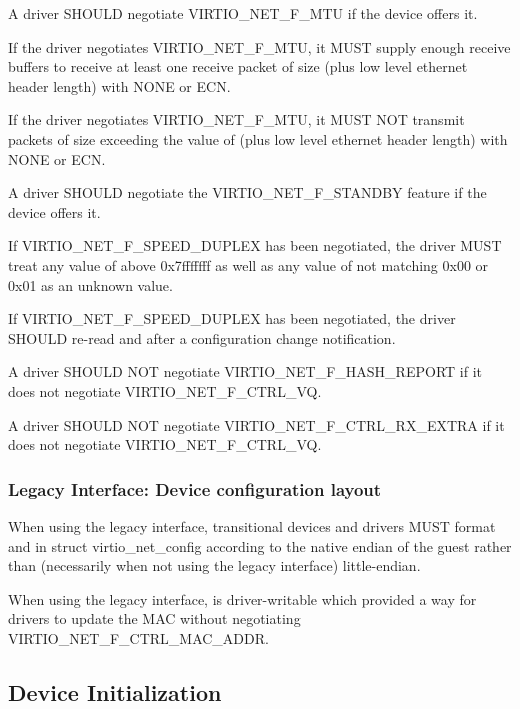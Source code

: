 A driver SHOULD negotiate VIRTIO_NET_F_MTU if the device offers it.

If the driver negotiates VIRTIO_NET_F_MTU, it MUST supply enough receive
buffers to receive at least one receive packet of size  (plus low
level ethernet header length) with  NONE or ECN.

If the driver negotiates VIRTIO_NET_F_MTU, it MUST NOT transmit packets of
size exceeding the value of  (plus low level ethernet header length)
with  NONE or ECN.

A driver SHOULD negotiate the VIRTIO_NET_F_STANDBY feature if the device offers it.

If VIRTIO_NET_F_SPEED_DUPLEX has been negotiated,
the driver MUST treat any value of  above
0x7fffffff as well as any value of  not
matching 0x00 or 0x01 as an unknown value.

If VIRTIO_NET_F_SPEED_DUPLEX has been negotiated, the driver
SHOULD re-read  and  after a
configuration change notification.

A driver SHOULD NOT negotiate VIRTIO_NET_F_HASH_REPORT if it
does not negotiate VIRTIO_NET_F_CTRL_VQ.

A driver SHOULD NOT negotiate VIRTIO_NET_F_CTRL_RX_EXTRA if it
does not negotiate VIRTIO_NET_F_CTRL_VQ.

\subsubsection{Legacy Interface: Device configuration layout}\label{sec:Device Types / Network Device / Device configuration layout / Legacy Interface: Device configuration layout}
\label{sec:Device Types / Block Device / Feature bits / Device configuration layout / Legacy Interface: Device configuration layout}
When using the legacy interface, transitional devices and drivers
MUST format  and
 in struct virtio_net_config
according to the native endian of the guest rather than
(necessarily when not using the legacy interface) little-endian.

When using the legacy interface,  is driver-writable
which provided a way for drivers to update the MAC without
negotiating VIRTIO_NET_F_CTRL_MAC_ADDR.

\subsection{Device Initialization}\label{sec:Device Types / Network Device / Device Initialization}

